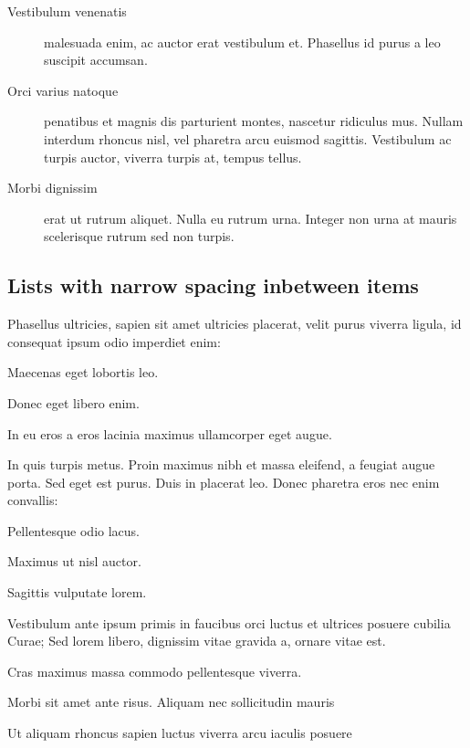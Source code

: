 \begin{description}
	\item[Vestibulum venenatis] malesuada enim, ac auctor erat vestibulum et. Phasellus id purus a leo suscipit accumsan.
	\item[Orci varius natoque] penatibus et magnis dis parturient montes, nascetur ridiculus mus. Nullam interdum rhoncus nisl, vel pharetra arcu euismod sagittis. Vestibulum ac turpis auctor, viverra turpis at, tempus tellus.
	\item[Morbi dignissim] erat ut rutrum aliquet. Nulla eu rutrum urna. Integer non urna at mauris scelerisque rutrum sed non turpis.
\end{description}

\subsection{Lists with narrow spacing inbetween items}

Phasellus ultricies, sapien sit amet ultricies placerat, velit purus viverra ligula, id consequat ipsum odio imperdiet enim:
\begin{compactenum}
	\item Maecenas eget lobortis leo.
	\item Donec eget libero enim.
	\item In eu eros a eros lacinia maximus ullamcorper eget augue.
\end{compactenum}

\bigskip

In quis turpis metus. Proin maximus nibh et massa eleifend, a feugiat augue porta. Sed eget est purus. Duis in placerat leo. Donec pharetra eros nec enim convallis:
\begin{compactitem}
	\item Pellentesque odio lacus.
	\item Maximus ut nisl auctor.
	\item Sagittis vulputate lorem.
\end{compactitem}

\bigskip

Vestibulum ante ipsum primis in faucibus orci luctus et ultrices posuere cubilia Curae; Sed lorem libero, dignissim vitae gravida a, ornare vitae est.
\begin{compactdesc}
	\item[Cras maximus] massa commodo pellentesque viverra.
	\item[Morbi sit] amet ante risus. Aliquam nec sollicitudin mauris
	\item[Ut aliquam rhoncus sapien] luctus viverra arcu iaculis posuere
\end{compactdesc}


